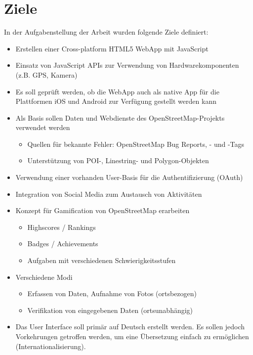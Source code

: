 \section{Ziele}
In der Aufgabenstellung der Arbeit wurden folgende Ziele definiert:
\begin{itemize}
	\item Erstellen einer Cross-platform HTML5 \gls{WebApp} mit JavaScript
	\item Einsatz von JavaScript \glspl{API} zur Verwendung von Hardwarekomponenten (z.B. GPS, Kamera)
	\item Es soll geprüft werden, ob die \gls{WebApp} auch als native App für die Plattformen iOS und Android zur Verfügung gestellt werden kann 
	\item Als Basis sollen Daten und Webdienste des \gls{OpenStreetMap}-Projekts verwendet werden
	\begin{itemize}
		\item Quellen für bekannte Fehler: \gls{OpenStreetMap} Bug Reports, - und -\glspl{Tag}
		\item Unterstützung von \gls{POI}-, Linestring- und Polygon-Objekten
	\end{itemize}
	\item Verwendung einer vorhanden User-Basis für die Authentifizierung (\gls{OAuth})
	\item Integration von Social Media zum Austausch von Aktivitäten
	\item Konzept für Gamification von \gls{OpenStreetMap} erarbeiten
	\begin{itemize}
		\item Highscores / Rankings
		\item Badges / Achievements
		\item Aufgaben mit verschiedenen Schwierigkeitsstufen
	\end{itemize}
	\item Verschiedene Modi
	\begin{itemize}
		\item Erfassen von Daten, Aufnahme von Fotos (ortsbezogen)
		\item Verifikation von eingegebenen Daten (ortsunabhängig)
	\end{itemize}
	\item Das User Interface soll primär auf Deutsch erstellt werden. Es sollen jedoch Vorkehrungen getroffen werden, um eine Übersetzung einfach zu ermöglichen (Internationalisierung).
\end{itemize}


